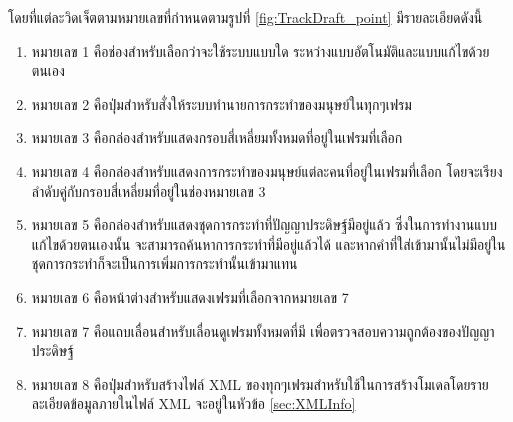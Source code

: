 โดยที่แต่ละวิดเจ็ตตามหมายเลขที่กำหนดตามรูปที่ \ref{fig:TrackDraft_point} มีรายละเอียดดังนี้
\begin{enumerate}
	\setlength\itemsep{-0.25em}
    \item หมายเลข 1 คือช่องสำหรับเลือกว่าจะใช้ระบบแบบใด ระหว่างแบบอัตโนมัติและแบบแก้ไขด้วยตนเอง
    \item หมายเลข 2 คือปุ่มสำหรับสั่งให้ระบบทำนายการกระทำของมนุษย์ในทุกๆเฟรม
    \item หมายเลข 3 คือกล่องสำหรับแสดงกรอบสี่เหลี่ยมทั้งหมดที่อยู่ในเฟรมที่เลือก
	\item หมายเลข 4 คือกล่องสำหรับแสดงการกระทำของมนุษย์แต่ละคนที่อยู่ในเฟรมที่เลือก โดยจะเรียงลำดับคู่กับกรอบสี่เหลี่ยมที่อยู่ในช่องหมายเลข 3
    \item หมายเลข 5 คือกล่องสำหรับแสดงชุดการกระทำที่ปัญญาประดิษฐ์มีอยู่แล้ว ซึ่งในการทำงานแบบแก้ไขด้วยตนเองนั้น จะสามารถค้นหาการกระทำที่มีอยู่แล้วได้ 
    และหากคำที่ใส่เข้ามานั้นไม่มีอยู่ในชุดการกระทำก็จะเป็นการเพิ่มการกระทำนั้นเข้ามาแทน
	\item หมายเลข 6 คือหน้าต่างสำหรับแสดงเฟรมที่เลือกจากหมายเลข 7
	\item หมายเลข 7 คือแถบเลื่อนสำหรับเลื่อนดูเฟรมทั้งหมดที่มี เพื่อตรวจสอบความถูกต้องของปัญญาประดิษฐ์
	\item หมายเลข 8 คือปุ่มสำหรับสร้างไฟล์ XML ของทุกๆเฟรมสำหรับใช้ในการสร้างโมเดลโดยรายละเอียดข้อมูลภายในไฟล์ XML จะอยู่ในหัวข้อ \ref{sec:XMLInfo}
\end{enumerate}
\clearpage

